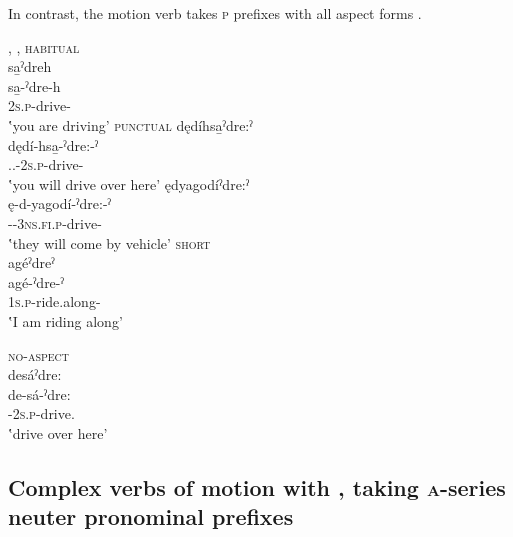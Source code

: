 In contrast, the motion verb   takes \textsc{p} prefixes with all aspect forms .

\ea\label{ex:drivex}  , , 
\ea \textsc{habitual}\\
sa̱ˀdreh \\
\gll sa̱-ˀdre-h \\
\textsc{2s.p}-drive-{\habitual}\\
\glt ‛you are driving'
\ex \textsc{punctual}
\ea dędíhsa̱ˀdre:ˀ\\
\gll dędí-hsa̱-ˀdre:-ˀ \\
\textsc{{\dualic}.{\future}.{\cislocative}-2s.p}-drive-{\punctual}\\
\glt ‛you will drive over here'
\ex ędyagodíˀdre:ˀ \\
\gll ę-d-yagodí-ˀdre:-ˀ\\
\textsc{{\future}-{{\cislocative}}-3ns.fi.p}-drive-{\punctual}\\
\glt ‛they will come by vehicle'
\z
\ex \textsc{short }\\
agéˀdreˀ\\
\gll agé-ˀdre-ˀ\\
\textsc{1s.p}-ride.along-{\stative}\\
\glt ‛I am riding along'

\ex \textsc{no-aspect}\\
desáˀdre:\\
\gll de-sá-ˀdre:\\
\textsc{{\dualic}-2s.p}-drive.{\noaspect}\\
\glt ‛drive over here'

\z
\z

\subsection{Complex verbs of motion with  , taking \textsc{a}-series neuter pronominal prefixes} \label{Complex verbs of motion with A neuter pronominal prefixes}


